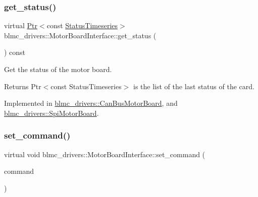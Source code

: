 \mbox{\label{classblmc__drivers_1_1MotorBoardInterface_a13b1ffa7d10c1c753d76eaf5368714e3}} 
\subsubsection{\texorpdfstring{get\+\_\+status()}{get\_status()}}
{\footnotesize\ttfamily virtual \hyperlink{classblmc__drivers_1_1MotorBoardInterface_a6a733b7ed7a3a96f6b0712b6bb5307f8}{Ptr}$<$const \hyperlink{classblmc__drivers_1_1MotorBoardInterface_ae3777e484dda60c4abe87f2b542ddfb8}{Status\+Timeseries}$>$ blmc\+\_\+drivers\+::\+Motor\+Board\+Interface\+::get\+\_\+status (\begin{DoxyParamCaption}{ }\end{DoxyParamCaption}) const\hspace{0.3cm}{\ttfamily [pure virtual]}}



Get the status of the motor board. 

\begin{DoxyReturn}{Returns}
Ptr$<$const Status\+Timeseries$>$ is the list of the last status of the card. 
\end{DoxyReturn}


Implemented in \hyperlink{classblmc__drivers_1_1CanBusMotorBoard_a7e62dd5126422cfbf587f9c265374fdc}{blmc\+\_\+drivers\+::\+Can\+Bus\+Motor\+Board}, and \hyperlink{classblmc__drivers_1_1SpiMotorBoard_a2402ab8f55dce8c4bc35bae619e61e23}{blmc\+\_\+drivers\+::\+Spi\+Motor\+Board}.

\mbox{\label{classblmc__drivers_1_1MotorBoardInterface_a86b4ff810ca652d6761090ceaff65621}} 
\subsubsection{\texorpdfstring{set\+\_\+command()}{set\_command()}}
{\footnotesize\ttfamily virtual void blmc\+\_\+drivers\+::\+Motor\+Board\+Interface\+::set\+\_\+command (\begin{DoxyParamCaption}\item[{const \hyperlink{classblmc__drivers_1_1MotorBoardCommand}{Motor\+Board\+Command} \&}]{command }\end{DoxyParamCaption})\hspace{0.3cm}{\ttfamily [pure virtual]}}



